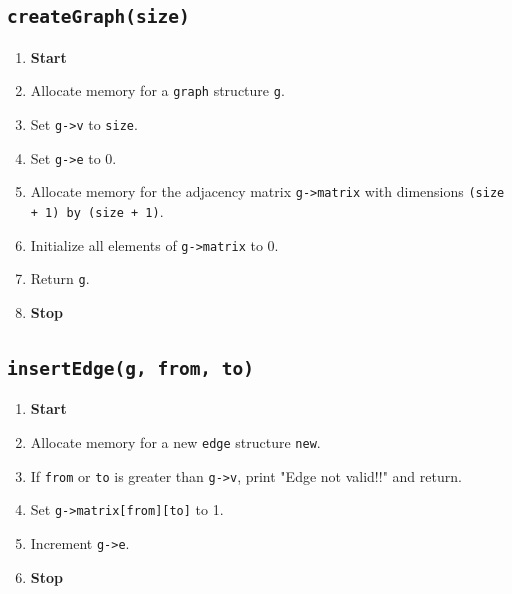 {  \subsection{\texttt{createGraph(size)}}
  \begin{enumerate}[label=\arabic*:,left=0pt]
    \item \textbf{Start}
    \item Allocate memory for a \texttt{graph} structure \texttt{g}.
    \item Set \texttt{g->v} to \texttt{size}.
    \item Set \texttt{g->e} to 0.
    \item Allocate memory for the adjacency matrix \texttt{g->matrix} with dimensions \texttt{(size + 1) by (size + 1)}.
    \item Initialize all elements of \texttt{g->matrix} to 0.
    \item Return \texttt{g}.
    \item \textbf{Stop}
  \end{enumerate}

  \subsection{\texttt{insertEdge(g, from, to)}}
  \begin{enumerate}[label=\arabic*:,left=0pt]
    \item \textbf{Start}
    \item Allocate memory for a new \texttt{edge} structure \texttt{new}.
    \item If \texttt{from} or \texttt{to} is greater than \texttt{g->v}, print "Edge not valid!!" and return.
    \item Set \texttt{g->matrix[from][to]} to 1.
    \item Increment \texttt{g->e}.
    \item \textbf{Stop}
  \end{enumerate}

}
